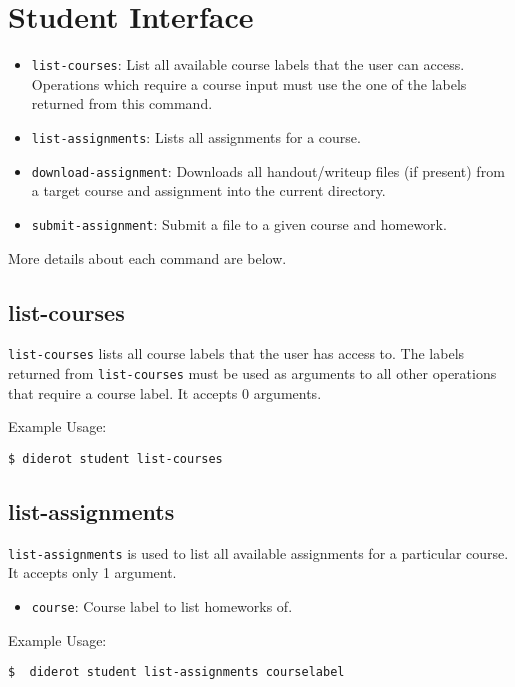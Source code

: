 \section{Student Interface}

\begin{itemize}
  \item \verb|list-courses|: List all available course labels that the user can access.
    Operations which require a course input must use the one of the labels returned from this command.
  \item \verb|list-assignments|: Lists all assignments for a course.
  \item \verb|download-assignment|: Downloads all handout/writeup files (if present) from a
    target course and assignment into the current directory.
  \item \verb|submit-assignment|: Submit a file to a given course and homework.
\end{itemize}

More details about each command are below.

\subsection{list-courses}

\verb|list-courses| lists all course labels that the user has access to.
%
The labels returned from \verb|list-courses| must be used as arguments to all other
operations that require a course label.
%
It accepts 0 arguments.

Example Usage:
\begin{verbatim}
$ diderot student list-courses
\end{verbatim}

\subsection{list-assignments}

\verb|list-assignments| is used to list all available assignments for a particular course.
%
It accepts only 1 argument.
\begin{itemize}
  \item \verb|course|: Course label to list homeworks of.
\end{itemize}

Example Usage:
\begin{verbatim}
$  diderot student list-assignments courselabel
\end{verbatim}


